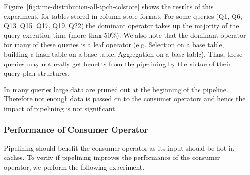 Figure~\ref{fig:time-distribution-all-tpch-colstore} shows the results of this experiment, for tables stored in column store format. 
For some queries (Q1, Q6, Q13, Q15, Q17, Q19, Q22) the dominant operator takes up the majority of the query execution time (more than 50\%).
We also note that the dominant operator for many of these queries is a leaf operator (e.g. Selection on a base table, building a hash table on a base table, Aggregation on a base table). 
Thus, these queries may not really get benefits from the pipelining by the virtue of their query plan structures.

In many queries large data are pruned out at the beginning of the pipeline. 
Therefore not enough data is passed on to the consumer operators and hence the impact of pipelining is not significant. 

\subsubsection{Performance of Consumer Operator}
Pipelining should benefit the consumer operator as its input should be hot in caches.
To verify if pipelining improves the performance of the consumer operator, we perform the following experiment.

